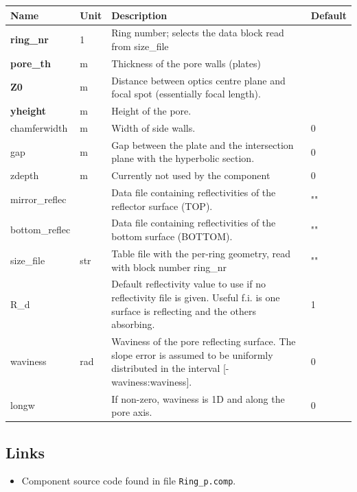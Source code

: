 \begin{longtable}{p{}p{}p{}p{}}
\toprule
\textbf{Name} & \textbf{Unit} & \textbf{Description} & \textbf{Default} \\
\midrule
\endhead
\textbf{ring\_nr} & 1 & Ring number; selects the data block read from size\_file &  \\
\textbf{pore\_th} & m & Thickness of the pore walls (plates) &  \\
\textbf{Z0} & m & Distance between optics centre plane and focal spot (essentially focal length). &  \\
\textbf{yheight} & m & Height of the pore. &  \\
chamferwidth & m & Width of side walls. & 0 \\
gap & m & Gap between the plate and the intersection plane with the hyperbolic section. & 0 \\
zdepth & m & Currently not used by the component & 0 \\
mirror\_reflec &   & Data file containing reflectivities of the reflector surface (TOP). & "" \\
bottom\_reflec &   & Data file containing reflectivities of the bottom surface (BOTTOM). & "" \\
size\_file & str & Table file with the per-ring geometry, read with block number ring\_nr & "" \\
R\_d &   & Default reflectivity value to use if no reflectivity file is given. Useful f.i. is one surface is reflecting and the others absorbing. & 1 \\
waviness & rad & Waviness of the pore reflecting surface. The slope error is assumed to be uniformly distributed in the interval [-waviness:waviness]. & 0 \\
longw &   & If non-zero, waviness is 1D and along the pore axis. & 0 \\
\bottomrule
\end{longtable}

\subsection*{Links}
\begin{itemize}
  \item Component source code found in file \texttt{Ring\_p.comp}.
\end{itemize}
